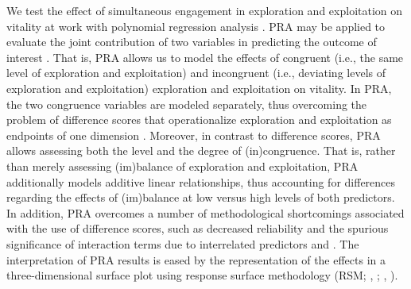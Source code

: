 \documentclass[man]{apa7}
\begin{document}
We test the effect of simultaneous engagement in exploration and exploitation on vitality at work with polynomial regression analysis \parencite[PRA;][]{Edwards.1993a, Schonbrodt2018, Humberg2019}. 
PRA may be applied to evaluate the joint contribution of two variables in predicting the outcome of interest \parencite{Edwards.1993a}. 
That is, PRA allows us to model the effects of congruent (i.e., the same level of exploration and exploitation) and incongruent (i.e., deviating levels of exploration and exploitation) exploration and exploitation on vitality. 
In PRA, the two congruence variables are modeled separately, thus overcoming the problem of difference scores that operationalize exploration and exploitation as endpoints of one dimension \parencite{Edwards.1993a}.
Moreover, in contrast to difference scores, PRA allows assessing both the level and the degree of (in)congruence. 
That is, rather than merely assessing (im)balance of exploration and exploitation, PRA additionally models additive linear relationships, thus accounting for differences regarding the effects of (im)balance at low versus high levels of both predictors. 
In addition, PRA overcomes a number of methodological shortcomings associated with the use of difference scores, such as decreased reliability and the spurious significance of interaction terms due to interrelated predictors and  \parencite{Cortina1993}. 
The interpretation of PRA results is eased by the representation of the effects in a three-dimensional surface plot \parencite{Edwards.1993a} using response surface methodology (RSM; \citeauthor{Humberg2019}, \citeyear{Humberg2019}; \citeauthor{Shanock.2010b}, \citeyear{Shanock.2010b}). 




\end{document}
